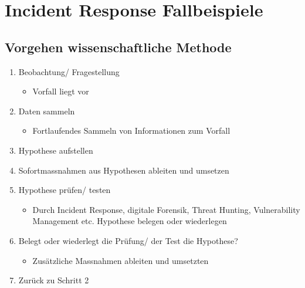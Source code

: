 \section{Incident Response Fallbeispiele}

\subsection{Vorgehen wissenschaftliche Methode}
\begin{enumerate}
    \item Beobachtung/ Fragestellung
    \begin{itemize}
        \item Vorfall liegt vor
    \end{itemize}
    \item Daten sammeln
    \begin{itemize}
        \item Fortlaufendes Sammeln von Informationen zum Vorfall
    \end{itemize}
    \item Hypothese aufstellen
    \item Sofortmassnahmen aus Hypothesen ableiten und umsetzen
    \item Hypothese prüfen/ testen
    \begin{itemize}
        \item Durch Incident Response, digitale Forensik, Threat Hunting, Vulnerability Management etc. Hypothese belegen oder wiederlegen
    \end{itemize}
    \item Belegt oder wiederlegt die Prüfung/ der Test die Hypothese?
    \begin{itemize}
        \item Zusätzliche Massnahmen ableiten und umsetzten
    \end{itemize}
    \item Zurück zu Schritt 2
\end{enumerate}\grqq{}

